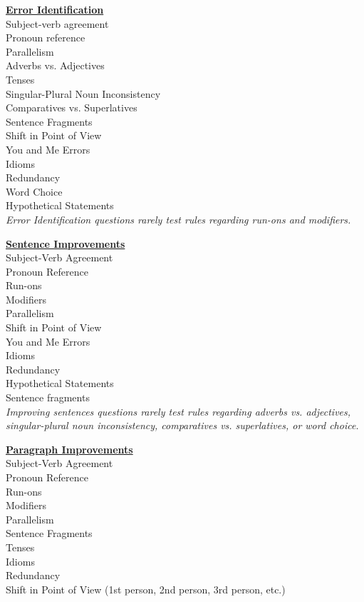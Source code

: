 \bigskip
\begin{center}
\textbf{\underline{Error Identification}}\\

\bigskip
Subject-verb agreement\\
Pronoun reference\\
Parallelism\\
Adverbs vs. Adjectives\\
Tenses\\
Singular-Plural Noun Inconsistency\\
Comparatives vs. Superlatives\\
Sentence Fragments\\
Shift in Point of View\\
You and Me Errors\\
Idioms\\
Redundancy\\
Word Choice\\
Hypothetical Statements\\

\bigskip
\textit{Error Identification questions rarely test rules regarding run-ons and modifiers.}

\bigskip

\textbf{\underline{Sentence Improvements}}\\

\bigskip
Subject-Verb Agreement\\
Pronoun Reference\\
Run-ons\\
Modifiers\\
Parallelism\\
Shift in Point of View\\
You and Me Errors\\
Idioms\\
Redundancy\\
Hypothetical Statements\\
Sentence fragments\\

\bigskip
\textit{Improving sentences questions rarely test rules regarding adverbs vs. adjectives, singular-plural noun inconsistency, comparatives vs. superlatives, or word choice.} 

\bigskip
\textbf{\underline{Paragraph Improvements}}\\
\bigskip
Subject-Verb Agreement\\
Pronoun Reference\\
Run-ons\\
Modifiers\\
Parallelism\\
Sentence Fragments\\
Tenses\\
Idioms\\
Redundancy\\
Shift in Point of View (1st person, 2nd person, 3rd person, etc.)\\


\end{center}
